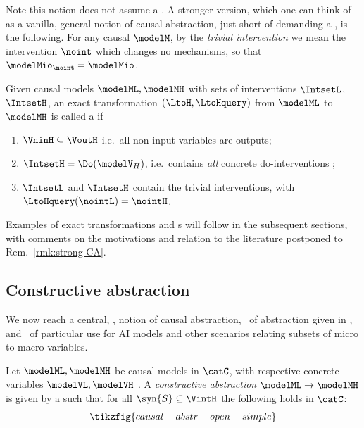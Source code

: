 \documentclass{article}
\begin{document}
Note this notion does not assume a \varalign. A stronger version, which one can think of as a vanilla, general notion of causal abstraction, just short of demanding a \varalign, is the following. 
For any causal $\modelM$, by the \emph{trivial intervention} 
we mean the intervention $\noint$ which changes no mechanisms, so that $\modelMio_\noint = \modelMio$. 


\begin{definition}[\strongCAcaps]  \label{def:strong-CA}
Given causal models $\modelML, \modelMH$ with sets of interventions $\IntsetL$, $\IntsetH$, an exact transformation $(\LtoH, \LtoHquery)$ from $\modelML$ to $\modelMH$ is called a \emph{\strongCA} if 
\begin{enumerate}
	\item $\VninH \subseteq \VoutH$ 
	i.e.~all non-input variables are outputs;
	\item $\IntsetH=\Do(\modelV_H)$, i.e.~contains \emph{all} concrete do-interventions ; %
	\item 
	$\IntsetL$ and $\IntsetH$ contain the trivial interventions, with $\LtoHquery(\nointL)=\nointH$. 
\end{enumerate}
\end{definition}

Examples of exact transformations and \strongCA s will follow in the subsequent sections, with comments on the motivations and relation to the literature postponed to Rem.~\ref{rmk:strong-CA}.


\subsection{Constructive abstraction} \label{subsec:CCA}

We now reach a central, , notion of causal abstraction, \ of abstraction given in \cite{BeckersEtAl_2019_AbstractingCausalModles}, and \ of particular use for AI models and other scenarios relating subsets of micro to macro variables.

\begin{definition} \label{def:CCA}
\cite[Def 3.19]{BeckersEtAl_2019_AbstractingCausalModles} 
Let $\modelML, \modelMH$ be causal models in $\catC$, with respective concrete variables $\modelVL, \modelVH$ . A  
\emph{constructive abstraction} $\modelML \to \modelMH$ is given by a \rl{\varalign\ $\dvaralign{\HtoL}{\LtoH}{\modelVL}{\modelVH}$} such that for all $\syn{S} \subseteq \VintH$  
the following holds in $\catC$: 
\begin{equation} \label{eq:CAabstraction}
\tikzfig{causal-abstr-open-simple}
\end{equation}
\end{definition} 
\end{document}
